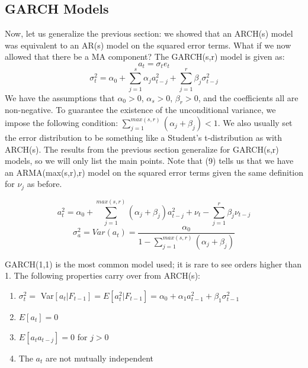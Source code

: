 \documentclass[12pt]{article}
\begin{document}
\subsection{GARCH Models}

Now, let us generalize the previous section: we showed that an ARCH(s) model was equivalent to an AR(s) model on the squared error terms. What if we now allowed that there be a MA component? The GARCH(s,r) model is given as:
    \begin{equation}
        a_t = \sigma_t e_t
    \end{equation}
    \begin{equation}
        \sigma_t^2 = \alpha_0 + \sum_{j=1}^{s} \alpha_ja^2_{t-j} + \sum_{j=1}^{r} \beta_j \sigma^2_{t-j}
    \end{equation}
We have the assumptions that $\alpha_0 > 0$, $\alpha_s > 0$, $\beta_r > 0$, and the coefficients all are non-negative. To guarantee the existence of the unconditional variance, we impose the following condition: $\sum_{j=1}^{max(s,r)} (\alpha_j + \beta_j) < 1$. We also usually set the error distribution to be something like a Student's t-distribution as with ARCH(s). The results from the previous section generalize for GARCH(s,r) models, so we will only list the main points. Note that (9) tells us that we have an ARMA(max(s,r),r) model on the squared error terms given the same definition for $\nu_j$ as before. 

\begin{equation}
    a^2_t = \alpha_0 + \sum_{j=1}^{max(s,r)} (\alpha_j + \beta_j)a^2_{t-j} +  \nu_t - \sum_{j=1}^{r} \beta_j\nu_{t-j}    
\end{equation}
\begin{equation}
    \sigma^2_a = Var(a_t) = \frac{\alpha_0}{1-\sum_{j=1}^{max(s,r)} (\alpha_j + \beta_j)}
\end{equation}

 GARCH(1,1) is the most common model used; it is rare to see orders higher than 1. The following properties carry over from ARCH(s):

\begin{enumerate}
    \item $\sigma^2_t =$ Var$[a_t|F_{t-1}] = E[a^2_t|F_{t-1}] = \alpha_0 + \alpha_1a^2_{t-1} + \beta_1\sigma^2_{t-1}$
    
    \item $E[a_t] = 0$
    
    \item $E[a_ta_{t-j}] = 0$ for $j>0$
    
    \item The $a_t$ are not mutually independent
    
\end{enumerate}
\end{document}
